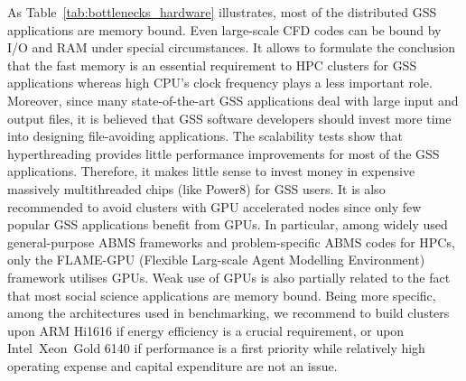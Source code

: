 As Table~\ref{tab:bottlenecks_hardware} illustrates, most of the distributed GSS applications are memory bound. Even large-scale CFD codes can be bound by I/O and RAM under special circumstances. It allows to formulate the conclusion that the fast memory is an essential requirement to HPC clusters for GSS applications whereas high CPU's clock frequency plays a less important role. Moreover, since many state-of-the-art GSS applications deal with large input and output files, it is believed that GSS software developers should invest more time into designing file-avoiding applications. The scalability tests show that hyperthreading provides little performance improvements for most of the GSS applications. Therefore, it makes little sense to invest money in expensive massively multithreaded chips (like Power8) for GSS users. It is also recommended to avoid clusters with GPU accelerated nodes since only few popular GSS applications benefit from GPUs. In particular, among widely used general-purpose ABMS frameworks and problem-specific ABMS codes for HPCs, only the FLAME-GPU (Flexible Larg-scale Agent Modelling Environment) \cite{2011:flame_gpu,2018:flame_gpu} framework utilises GPUs. Weak use of GPUs is also partially related to the fact that most social science applications are memory bound. Being more specific, among the architectures used in benchmarking, we recommend to build clusters upon ARM Hi1616 if energy efficiency is a crucial requirement, or upon Intel\textregistered\ Xeon\textregistered\ Gold 6140 if performance is a first priority while relatively high operating expense and capital expenditure are not an issue.


